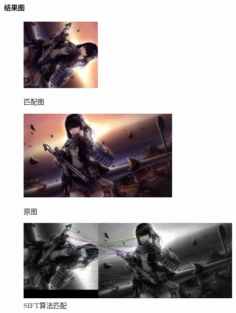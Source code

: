 \documentclass{article}
\begin{document}
        \paragraph{结果图}
        \begin{figure}[htbp]
                \begin{minipage}[t]{0.5\linewidth}\centering
                \includegraphics[width=4cm]{test1.png}
                \caption{匹配图}\label{1-a}
                \end{minipage}
                \begin{minipage}[t]{0.5\linewidth}\centering
                \includegraphics[width=8cm]{test2.png}
                \caption{原图}\label{1-b}
                \end{minipage}
                \begin{minipage}[t]{1\linewidth}\centering
                \includegraphics[width=12cm]{sift_matches.jpg}
                \caption{SIFT算法匹配}\label{1-c}
                \end{minipage}
            \end{figure}
\end{document}
